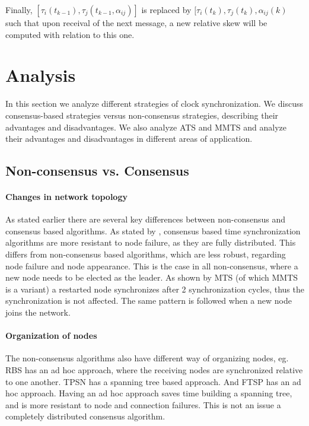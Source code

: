\documentclass[a4paper,12pt]{article}
\begin{document}
    Finally, $[\tau_i(t_{k-1}), \tau_j(t_{k-1},\alpha_{ij})]$ is replaced by $[\tau_i(t_k), \tau_j(t_k),\alpha_{ij}(k)$ such that upon receival of the next message, a new relative skew will be computed with relation to this one.
    
    

\section{Analysis}

In this section we analyze different strategies of clock synchronization. We discuss consensus-based strategies versus non-consensus strategies, describing their advantages and disadvantages. We also analyze ATS and MMTS and analyze their advantages and disadvantages in different areas of application.

\subsection{Non-consensus vs. Consensus}

\paragraph{Changes in network topology} As stated earlier there are several key differences between non-consensus and consensus based algorithms. As stated by \cite{SchenatoGamba07}, consensus based time synchronization algorithms are more resistant to node failure, as they are fully distributed. This differs from non-consensus based algorithms, which are less robust, regarding node failure and node appearance. This is the case in all non-consensus, where a new node needs to be elected as the leader. As shown by \citet{HeLiChenCheng13} MTS (of which MMTS is a variant) a restarted node synchronizes after 2 synchronization cycles, thus the synchronization is not affected. The same pattern is followed when a new node joins the network.

\paragraph{Organization of nodes} The non-consensus algorithms also have different way of organizing nodes, eg. RBS has an ad hoc approach, where the receiving nodes are synchronized relative to one another. TPSN has a spanning tree based approach. And FTSP has an ad hoc approach. Having an ad hoc approach saves time building a spanning tree, and is more resistant to node and connection failures. This is not an issue a completely distributed consensus algorithm.
\end{document}
